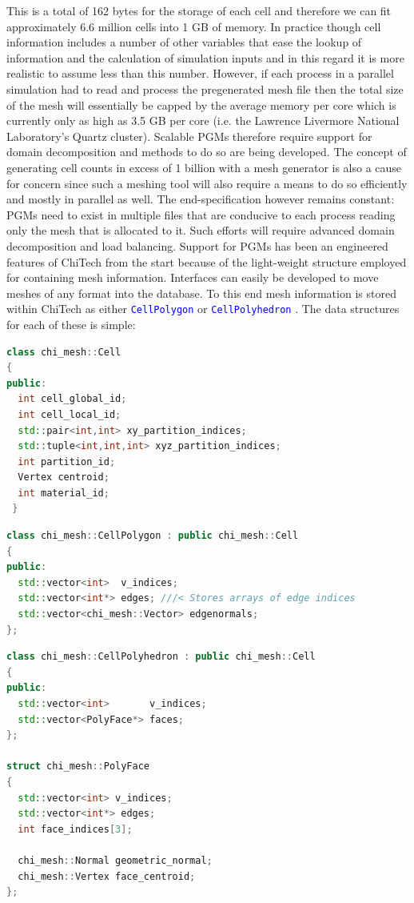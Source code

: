 \documentclass[11pt,letterpaper,titlepage]{article}
\newcommand{\xmltag}[1]{\textcolor{blue}{ \texttt{#1}} }
\numberwithin{equation}{section}
\begin{document}
This is a total of 162 bytes for the storage of each cell and therefore we can fit approximately 6.6 million cells into 1 GB of memory. In practice though cell information includes a number of other variables that ease the lookup of information and the calculation of simulation inputs and in this regard it is more realistic to assume less than this number. However, if each process in a parallel simulation had to read and process the pregenerated mesh file then the total size of the mesh will essentially be capped by the average memory per core which is currently only as high as 3.5 GB per core (i.e. the Lawrence Livermore National Laboratory's Quartz cluster).
\newline
\newline
Scalable PGMs therefore require support for domain decomposition and methods to do so are being developed. The concept of generating cell counts in excess of 1 billion with a mesh generator is also a cause for concern since such a meshing tool will also require a means to do so efficiently and mostly in parallel as well. The end-specification however remains constant: PGMs need to exist in multiple files that are conducive to each process reading only the mesh that is allocated to it. Such efforts will require advanced domain decomposition and load balancing.
\newline
\newline
Support for PGMs has been an engineered features of ChiTech from the start because of the light-weight structure employed for containing mesh information. Interfaces can easily be developed to move meshes of any format into the database. To this end mesh information is stored within ChiTech as either \xmltag{CellPolygon} or \xmltag{CellPolyhedron}. The data structures for each of these is simple:
\vspace{0.5cm}
\begin{lstlisting}[language=c++]
class chi_mesh::Cell
{
public:
  int cell_global_id;
  int cell_local_id;
  std::pair<int,int> xy_partition_indices;
  std::tuple<int,int,int> xyz_partition_indices;
  int partition_id;
  Vertex centroid;
  int material_id;
 }
\end{lstlisting}
\newpage
\begin{lstlisting}[language=c++]
class chi_mesh::CellPolygon : public chi_mesh::Cell
{
public:
  std::vector<int>  v_indices;
  std::vector<int*> edges; ///< Stores arrays of edge indices
  std::vector<chi_mesh::Vector> edgenormals;
};
\end{lstlisting}
\vspace{0.25cm}
\begin{lstlisting}[language=c++]
class chi_mesh::CellPolyhedron : public chi_mesh::Cell
{
public:
  std::vector<int>       v_indices;
  std::vector<PolyFace*> faces;
};

struct chi_mesh::PolyFace
{
  std::vector<int> v_indices;
  std::vector<int*> edges;
  int face_indices[3];

  chi_mesh::Normal geometric_normal;
  chi_mesh::Vertex face_centroid;
};
\end{lstlisting}
\end{document}
